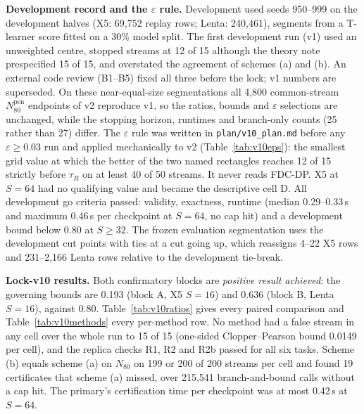 \documentclass[sigconf,anonymous,review]{acmart}
\newcommand{\eps}{\varepsilon}
\newcommand{\Npen}{N_{80}^{\text{pen}}}
\begin{document}
\textbf{Development record and the $\eps$ rule.} Development used seeds 950--999 on the development halves (X5: 69,752 replay rows; Lenta: 240,461), segments from a T-learner score fitted on a 30\% model split. The first development run (v1) used an unweighted centre, stopped streams at 12 of 15 although the theory note prespecified 15 of 15, and overstated the agreement of schemes (a) and (b). An external code review (B1--B5) fixed all three before the lock; v1 numbers are superseded. On these near-equal-size segmentations all 4,800 common-stream $\Npen$ endpoints of v2 reproduce v1, so the ratios, bounds and $\eps$ selections are unchanged, while the stopping horizon, runtimes and branch-only counts (25 rather than 27) differ. The $\eps$ rule was written in \texttt{plan/v10\_plan.md} before any $\eps \ge 0.03$ run and applied mechanically to v2 (Table~\ref{tab:v10eps}): the smallest grid value at which the better of the two named rectangles reaches 12 of 15 strictly before $\tau_R$ on at least 40 of 50 streams. It never reads FDC-DP. X5 at $S = 64$ had no qualifying value and became the descriptive cell D. All development go criteria passed: validity, exactness, runtime (median 0.29--0.33\,s and maximum 0.46\,s per checkpoint at $S = 64$, no cap hit) and a development bound below 0.80 at $S \ge 32$. The frozen evaluation segmentation uses the development cut points with ties at a cut going up, which reassigns 4--22 X5 rows and 231--2,166 Lenta rows relative to the development tie-break.



\textbf{Lock-v10 results.} Both confirmatory blocks are \emph{positive result achieved}: the governing bounds are 0.193 (block A, X5 $S = 16$) and 0.636 (block B, Lenta $S = 16$), against 0.80. Table~\ref{tab:v10ratios} gives every paired comparison and Table~\ref{tab:v10methods} every per-method row. No method had a false stream in any cell over the whole run to 15 of 15 (one-sided Clopper--Pearson bound 0.0149 per cell), and the replica checks R1, R2 and R2b passed for all six tasks. Scheme (b) equals scheme (a) on $N_{80}$ on 199 or 200 of 200 streams per cell and found 19 certificates that scheme (a) missed, over 215,541 branch-and-bound calls without a cap hit. The primary's certification time per checkpoint was at most 0.42\,s at $S = 64$.



\end{document}
